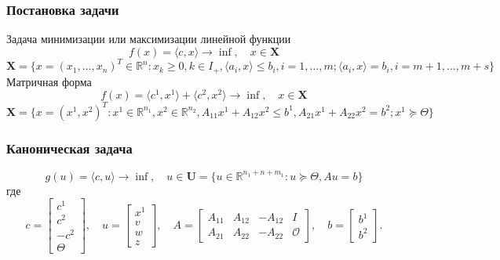 \documentclass[A4]{article}
\begin{document}
\subsubsection{Постановка задачи}
Задача минимизации или максимизации линейной функции
\begin{equation*}
f(x)=\langle c,x\rangle \rightarrow \inf,\quad x\in\mathbf{X}
\end{equation*}
\begin{equation*}
\mathbf{X}=\{x=(x_1,\ldots,x_n)^T\in\mathbb{R}^n:x_k\geqslant 0,k\in I_+,\langle a_i,x\rangle\leqslant b_i,i=1,\ldots,m;\langle a_i,x\rangle =b_i,i=m+1,\ldots,m+s\}
\end{equation*}
Матричная форма
\begin{equation*}
f(x)=\langle c^1,x^1\rangle+\langle c^2,x^2\rangle \rightarrow \inf,\quad x\in\mathbf{X}
\end{equation*}
\begin{equation*}
\mathbf{X}=\{x=(x^1,x^2)^T:x^1\in\mathbb{R}^{n_1},x^2\in\mathbb{R}^{n_2},A_{11}x^1+A_{12}x^2\leqslant b^1,A_{21}x^1+A_{22}x^2=b^2;x^{1} \succcurlyeq \Theta \}
\end{equation*}
\subsubsection{Каноническая задача}
\begin{equation*}
g(u)=\langle c,u \rangle\rightarrow\inf,\quad u\in\mathbf{U}=\{u\in \mathbb{R}^{n_1+n+m_1}:u\succcurlyeq\Theta,Au=b \}
\end{equation*}
где
\begin{equation*}
c=\left[\begin{array}{c}
c^{1} \\
c^{2} \\
-c^{2} \\
\Theta
\end{array}\right], \quad u=\left[\begin{array}{c}
x^{1} \\
v \\
w \\
z
\end{array}\right], \quad A=\left[\begin{array}{c|c|c|c}
A_{11} & A_{12} & -A_{12} & I \\
\hline A_{21} & A_{22} & -A_{22} & \mathcal{O}
\end{array}\right], \quad b=\left[\begin{array}{c}
b^{1} \\
b^{2}
\end{array}\right] .
\end{equation*}
\end{document}
